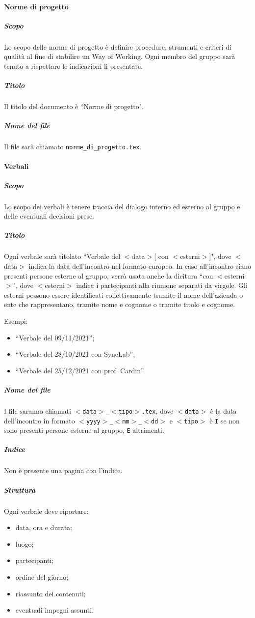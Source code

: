 \documentclass[a4paper, 12pt]{article}
\begin{document}
\paragraph{Norme di progetto}
\subparagraph{Scopo}
Lo scopo delle norme di progetto è definire procedure, strumenti e criteri di qualità al fine di stabilire un Way of Working. Ogni membro del gruppo sarà tenuto a rispettare le indicazioni lì presentate.
\subparagraph{Titolo}
Il titolo del documento è ``Norme di progetto".
\subparagraph{Nome del file}
Il file sarà chiamato \texttt{norme\_di\_progetto.tex}.

\paragraph{Verbali}
\subparagraph{Scopo}
Lo scopo dei verbali è tenere traccia del dialogo interno ed esterno al gruppo e delle eventuali decisioni prese.
\subparagraph{Titolo}
Ogni verbale sarà titolato ``Verbale del $<$data$>$[ con $<$esterni$>$]", dove $<$data$>$ indica la data dell'incontro nel formato europeo. In caso all'incontro siano presenti persone esterne al gruppo, verrà usata anche la dicitura ``con $<$esterni$>$", dove $<$esterni$>$ indica i partecipanti alla riunione separati da virgole. Gli esterni possono essere identificati collettivamente tramite il nome dell'azienda o ente che rappresentano, tramite nome e cognome o tramite titolo e cognome.

Esempi:
\begin{itemize}
\item ``Verbale del 09/11/2021'';
\item ``Verbale del 28/10/2021 con SyncLab'';
\item ``Verbale del 25/12/2021 con prof. Cardin''.
\end{itemize}
\subparagraph{Nome dei file}
I file saranno chiamati \texttt{$<$data$>$\_$<$tipo$>$.tex}, dove \texttt{$<$data$>$} è la data dell'incontro in formato \texttt{$<$yyyy$>$\_$<$mm$>$\_$<$dd$>$} e \texttt{$<$tipo$>$} è \texttt{I} se non sono presenti persone esterne al gruppo, \texttt{E} altrimenti.
\subparagraph{Indice}
Non è presente una pagina con l'indice.
\subparagraph{Struttura}
Ogni verbale deve riportare:
\begin{itemize}
\item data, ora e durata;
\item luogo;
\item partecipanti;
\item ordine del giorno;
\item riassunto dei contenuti;
\item eventuali impegni assunti.
\end{itemize}
\end{document}
